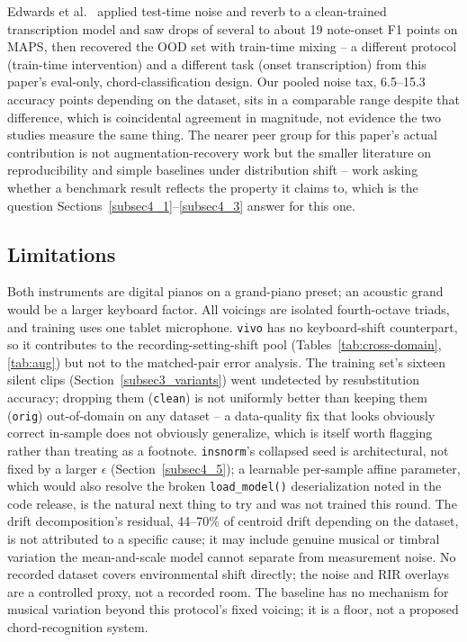 \documentclass[pdflatex,sn-mathphys-num,iicol]{sn-jnl}
\theoremstyle{thmstyleone}
\theoremstyle{thmstyletwo}
\theoremstyle{thmstylethree}
\begin{document}
Edwards et al.\ \cite{Edwards2024} applied test-time noise and reverb to a clean-trained transcription model and saw drops of several to about 19 note-onset F1 points on MAPS, then recovered the OOD set with train-time mixing -- a different protocol (train-time intervention) and a different task (onset transcription) from this paper's eval-only, chord-classification design. Our pooled noise tax, 6.5--15.3 accuracy points depending on the dataset, sits in a comparable range despite that difference, which is coincidental agreement in magnitude, not evidence the two studies measure the same thing. The nearer peer group for this paper's actual contribution is not augmentation-recovery work but the smaller literature on reproducibility and simple baselines under distribution shift \cite{Bouthillier2021}\cite{Geirhos2020} -- work asking whether a benchmark result reflects the property it claims to, which is the question Sections~\ref{subsec4_1}--\ref{subsec4_3} answer for this one.

\subsection{Limitations}\label{subsec5_3}

Both instruments are digital pianos on a grand-piano preset; an acoustic grand would be a larger keyboard factor. All voicings are isolated fourth-octave triads, and training uses one tablet microphone. \texttt{vivo} has no keyboard-shift counterpart, so it contributes to the recording-setting-shift pool (Tables~\ref{tab:cross-domain}, \ref{tab:aug}) but not to the matched-pair error analysis. The training set's sixteen silent clips (Section~\ref{subsec3_variants}) went undetected by resubstitution accuracy; dropping them (\texttt{clean}) is not uniformly better than keeping them (\texttt{orig}) out-of-domain on any dataset -- a data-quality fix that looks obviously correct in-sample does not obviously generalize, which is itself worth flagging rather than treating as a footnote. \texttt{insnorm}'s collapsed seed is architectural, not fixed by a larger $\epsilon$ (Section~\ref{subsec4_5}); a learnable per-sample affine parameter, which would also resolve the broken \texttt{load\_model()} deserialization noted in the code release, is the natural next thing to try and was not trained this round. The drift decomposition's residual, 44--70\% of centroid drift depending on the dataset, is not attributed to a specific cause; it may include genuine musical or timbral variation the mean-and-scale model cannot separate from measurement noise. No recorded dataset covers environmental shift directly; the noise and RIR overlays are a controlled proxy, not a recorded room. The baseline has no mechanism for musical variation beyond this protocol's fixed voicing; it is a floor, not a proposed chord-recognition system.
\end{document}

